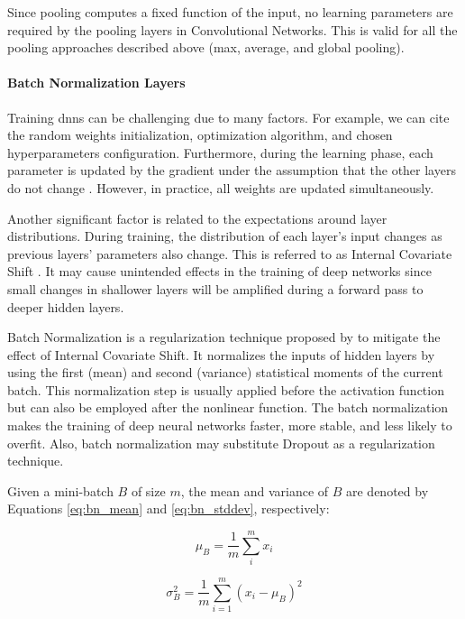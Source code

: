Since pooling computes a fixed function of the input, no learning parameters are required by the pooling layers in Convolutional Networks. This is valid for all the pooling approaches described above (max, average, and global pooling).


\paragraph{Batch Normalization Layers}

Training \aclp{dnn} can be challenging due to many factors. For example, we can cite the random weights initialization, optimization algorithm, and chosen hyperparameters configuration. Furthermore, during the learning phase, each parameter is updated by the gradient under the assumption that the other layers do not change \citep{goodfellow2016deep}. However, in practice, all weights are updated simultaneously.

Another significant factor is related to the expectations around layer distributions. During training, the distribution of each layer's input changes as previous layers' parameters also change. This is referred to as Internal Covariate Shift \citep{ioffe2015batch}. It may cause unintended effects in the training of deep networks since small changes in shallower layers will be amplified during a forward pass to deeper hidden layers.

Batch Normalization is a regularization technique proposed by \cite{ioffe2015batch} to mitigate the effect of Internal Covariate Shift. It normalizes the inputs of hidden layers by using the first (mean) and second (variance) statistical moments of the current batch. This normalization step is usually applied before the activation function but can also be employed after the nonlinear function. The batch normalization makes the training of deep neural networks faster, more stable, and less likely to overfit. Also, batch normalization may substitute Dropout as a regularization technique.

Given a mini-batch $B$ of size $m$, the mean and variance of $B$ are denoted by Equations \ref{eq:bn_mean} and \ref{eq:bn_stddev}, respectively:

\begin{equation}
\label{eq:bn_mean}
\mu_B = \frac{1}{m} \sum_{i}^{m} x_i
\end{equation}

\begin{equation}
\label{eq:bn_stddev}
\sigma_B^2 = \frac{1}{m} \sum_{i=1}^{m} (x_i - \mu_B)^{2}
\end{equation}

